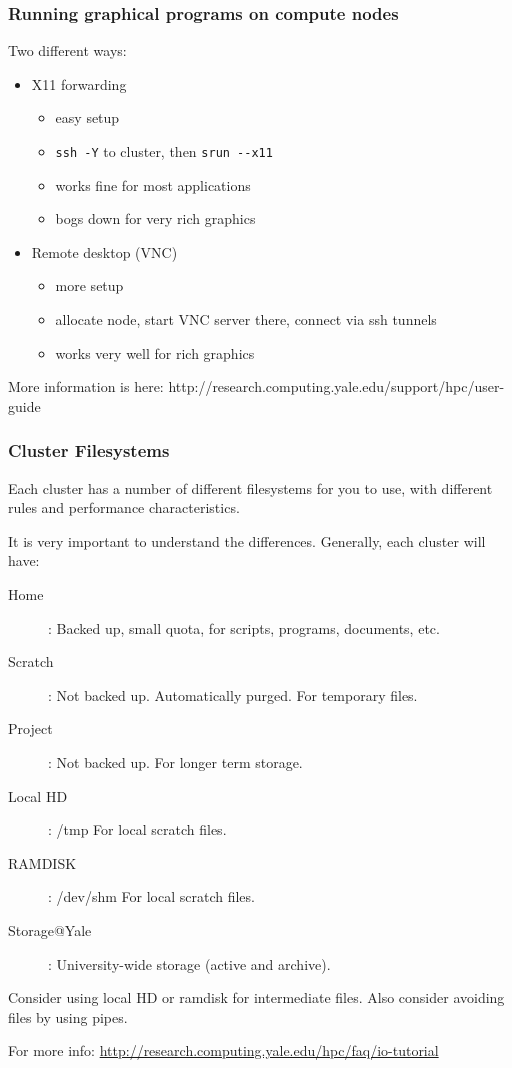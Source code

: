 \documentclass[10pt]{beamer}
\begin{document}
\begin{frame}[fragile]
\frametitle{Running graphical programs on compute nodes}
Two different ways:
\begin{itemize}
\item X11 forwarding
\begin{itemize}
\item easy setup
\item \verb+ssh -Y+ to cluster, then \verb+srun --x11+
\item works fine for most applications
\item bogs down for very rich graphics
\end{itemize}
\item Remote desktop (VNC)
\begin{itemize}
\item more setup
\item allocate node, start VNC server there, connect via ssh tunnels
\item works very well for rich graphics
\end{itemize}
\end{itemize}

More information is here:
http://research.computing.yale.edu/support/hpc/user-guide

\end{frame}

\begin{frame}[fragile]
\frametitle{Cluster Filesystems}
Each cluster has a number of different filesystems for you to use, with different
rules and performance characteristics.  

\vskip10pt

It is very important to understand the differences.  Generally, each cluster will have:

\begin{description}
\item[Home]: Backed up, small quota, for scripts, programs, documents, etc.
\item[Scratch]: Not backed up.  Automatically purged.  For temporary files.
\item[Project]: Not backed up.  For longer term storage.
\item[Local HD]: /tmp  For local scratch files.
\item[RAMDISK]: /dev/shm For local scratch files.
\item[Storage@Yale]: University-wide storage (active and archive).
\end{description}

Consider using local HD or ramdisk for intermediate files.  Also consider avoiding files by using pipes.

For more info: \url{http://research.computing.yale.edu/hpc/faq/io-tutorial}

\end{frame}
\end{document}
